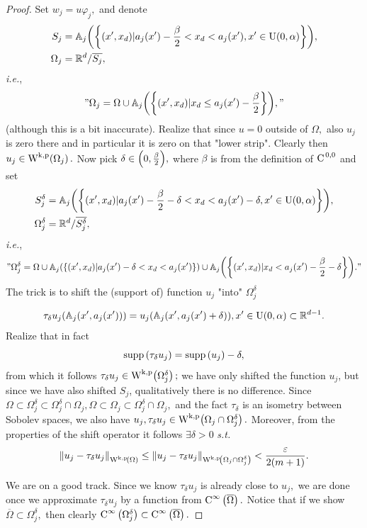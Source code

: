 \documentclass{article}
\begin{document}
\begin{proof}
	Set $w_j = u \varphi_j,$ and denote
	\begin{align*}
		S_j &=\mathbb{A}_j\qty(\qty{(x',x_d) | a_j(x') - \frac{\beta}{2}  < x_d < a_j(x') , x' \in \text{U}(0,\alpha)}), \\
	\Omega_j &= {\mathbb R}^{d} / \overline{S_j},
	\end{align*}
	\textit{i.e.},
	\[
		"\Omega_j = \Omega \cup \mathbb{A}_j\qty(\qty{(x',x_d)| x_d \leq a_j(x')- \frac{\beta}{2}}),"
	\]
	(although this is a bit inaccurate). Realize that since $u = 0$ outside of $\Omega,$ also $u_j$ is zero there and in particular it is zero on that "lower strip". Clearly then $u_j \in \WkpSet{\Omega_j}.$ Now pick $\delta \in \qty(0,\frac{\beta}{2}),$ where $\beta$ is from the definition of $\text{C}^{\!\,\, 0,0}$ and set
	\begin{align*}
	  		S_{j}^{\delta} &= \mathbb{A}_j\qty(\qty{(x',x_d) | a_j(x') - \frac{\beta}{2} - \delta < x_d < a_j(x') -\delta, x' \in \text{U}(0,\alpha)}), \\
		\Omega_j^{\delta} &= {\mathbb R}^{d} / \overline{S_{j}^{\delta}}, 
	\end{align*}
	\textit{i.e.},
	\[
		"\Omega_j^\delta = \Omega \cup \mathbb{A}_j\qty(\qty{(x',x_d)| a_j(x')-\delta < x_d < a_j (x')}) \cup \mathbb{A}_j \qty(\qty{(x',x_d)| x_d < a_j(x') - \frac{\beta}{2} - \delta})."
	\]
The trick is to shift the (support of) function $u_j$ "into" $\Omega_{j}^\delta$

	\[
		\tau_{\delta}u_j\qty(\mathbb{A}_j\qty(x', a_j(x'))) = u_j\qty(\mathbb{A}_j\qty(x', a_j(x') + \delta)), x' \in \text{U}(0,\alpha) \subset {\mathbb R}^{d-1}.
	\]
	Realize that in fact
	\[
		\operatorname{supp}\qty(\tau_{\delta}u_j) = \operatorname{supp}\qty(u_j) - \delta,
	\]
	from which it follows $\tau_{\delta}u_j \in \WkpSet{\Omega_j^{\delta}};$ we have only shifted the function $u_j$, but since we have also shifted $S_j$, qualitatively there is no difference. Since $ \Omega \subset \Omega_j^\delta \subset \Omega_j^{\delta} \cap \Omega_j, \Omega \subset \Omega_j \subset \Omega_j^{\delta} \cap \Omega_j,$ and the fact $\tau_{\delta}$ is an isometry between Sobolev spaces, we also have $u_j, \tau_{\delta}u_j \in \WkpSet{\Omega_{j} \cap \Omega_j^{\delta}}.$ Moreover, from the properties of the shift operator it follows $\exists \delta >0$ \textit{s.t.}
	\[
		\norm{u_j - \tau_{\delta}u_j}_{\WkpSet{\Omega}}\leq \norm{u_j - \tau_{\delta}u_j}_{\WkpSet{\Omega_j \cap \Omega_j^{\delta}}} < \frac{\varepsilon}{2\qty(m+1)}.
	\]

	We are on a good track. Since we know $\tau_{\delta}u_j$ is already close to $u_j,$ we are done once we approximate $\tau_{\delta}u_j$ by a function from $\text{C}^{\infty}\!\,\left(\overline{\Omega} \right).$ Notice that if we show $\overline{\Omega} \subset \Omega_j^{\delta},$ then clearly $\text{C}^{\infty}\!\,\left(\Omega_j^{\delta} \right) \subset \text{C}^{\infty}\!\,\left(\overline{\Omega} \right).$


\end{proof}
\end{document}
